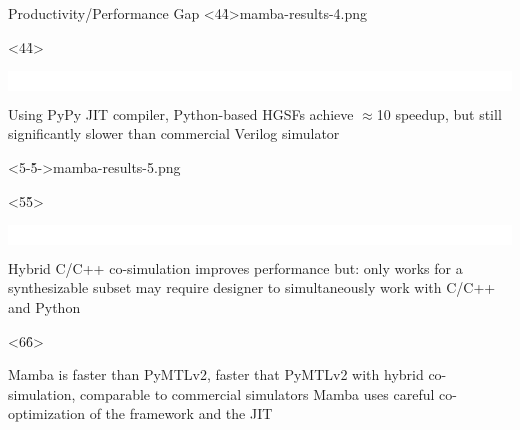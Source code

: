 \begin{frame}{Productivity/Performance Gap}
\cbxfigc<4\h4>{mamba-results-4.png}
\begin{onlyenv}<4\h4>
\vspace{-1.9in}\hfill
\colorbox{white}{%
  \begin{minipage}[c][1.9in][t]{0.088\tw}
    \mbox{\ }
  \end{minipage}
}

\medskip
\begin{cbxlist}[t]
  \1 Using PyPy JIT compiler, Python-based HGSFs achieve $\approx$10\X{}
  speedup, but still significantly slower than commercial Verilog
  simulator
\end{cbxlist}
\end{onlyenv}

\cbxfigc<5-\h5->{mamba-results-5.png}
\begin{onlyenv}<5\h5>
\vspace{-1.9in}\hfill
\colorbox{white}{%
  \begin{minipage}[c][1.9in][t]{0.088\tw}
    \mbox{\ }
  \end{minipage}
}

\medskip
\begin{cbxlist}[t]
  \1 Hybrid C/C++ co-simulation improves performance but:
  \2 only works for a synthesizable subset
  \2 may require designer to simultaneously work with C/C++ and Python
\end{cbxlist}
\end{onlyenv}

\begin{onlyenv}<6\h6>
\medskip
\begin{cbxlist}
  \1 Mamba is \BF{20\X{}} faster than PyMTLv2, \BF{4.5\X{}} faster that
  PyMTLv2 with hybrid co-simulation, comparable to commercial
  simulators \1 Mamba uses careful co-optimization of the framework and
  the JIT
\end{cbxlist}
\end{onlyenv}

\end{frame}

%
%
%
%
%
%
%
%

